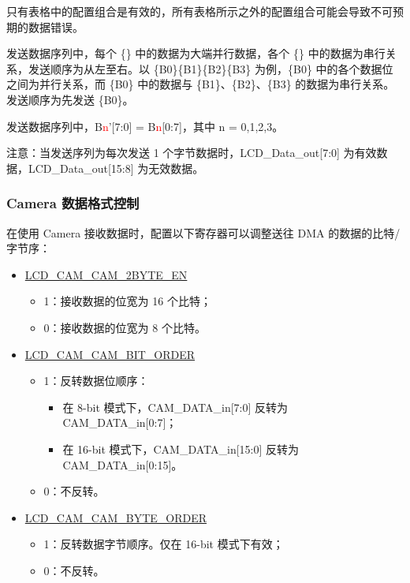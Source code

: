 \documentclass[main\_\_CN.tex]{subfiles}
\begin{document}
\begin{table}[H]
\begin{threeparttable}
\begin{tablenotes}
        \item[2] 只有表格中的配置组合是有效的，所有表格所示之外的配置组合可能会导致不可预期的数据错误。
        \item[3] 发送数据序列中，每个 \{\} 中的数据为大端并行数据，各个 \{\} 中的数据为串行关系，发送顺序为从左至右。以 \{B0\}\{B1\}\{B2\}\{B3\} 为例，\{B0\} 中的各个数据位之间为并行关系，而 \{B0\} 中的数据与 \{B1\}、\{B2\}、\{B3\} 的数据为串行关系。发送顺序为先发送 \{B0\}。
        \item[4] 发送数据序列中，B{\textcolor{red}{n}}'[7:0] = B{\textcolor{red}{n}}[0:7]，其中 n = 0,1,2,3。
    \end{tablenotes}
    \end{threeparttable}
\end{table}

\begin{tiplisting}
注意：当发送序列为每次发送 1 个字节数据时，LCD\_Data\_out[7:0] 为有效数据，LCD\_Data\_out[15:8] 为无效数据。
\end{tiplisting}

\subsubsection{Camera 数据格式控制} \label{cam_data_control}
在使用 Camera 接收数据时，配置以下寄存器可以调整送往 DMA 的数据的比特/字节序：
\begin{itemize}
    \item \hyperref[fielddesc:LCDCAMCAM2BYTEEN]{LCD\_CAM\_CAM\_2BYTE\_EN}
    \begin{itemize}
        \item 1：接收数据的位宽为 16 个比特；
        \item 0：接收数据的位宽为 8 个比特。
    \end{itemize}
    \item \hyperref[fielddesc:LCDCAMCAMBITORDER]{LCD\_CAM\_CAM\_BIT\_ORDER}
    \begin{itemize}
        \item 1：反转数据位顺序：
        \begin{itemize}
            \item 在 8-bit 模式下，CAM\_DATA\_in[7:0] 反转为 CAM\_DATA\_in[0:7]；
            \item 在 16-bit 模式下，CAM\_DATA\_in[15:0] 反转为 CAM\_DATA\_in[0:15]。
        \end{itemize}
        \item 0：不反转。
    \end{itemize}
    \item \hyperref[fielddesc:LCDCAMCAMBYTEORDER]{LCD\_CAM\_CAM\_BYTE\_ORDER}
    \begin{itemize}
        \item 1：反转数据字节顺序。仅在 16-bit 模式下有效；
        \item 0：不反转。
    \end{itemize}
\end{itemize}
\end{document}
